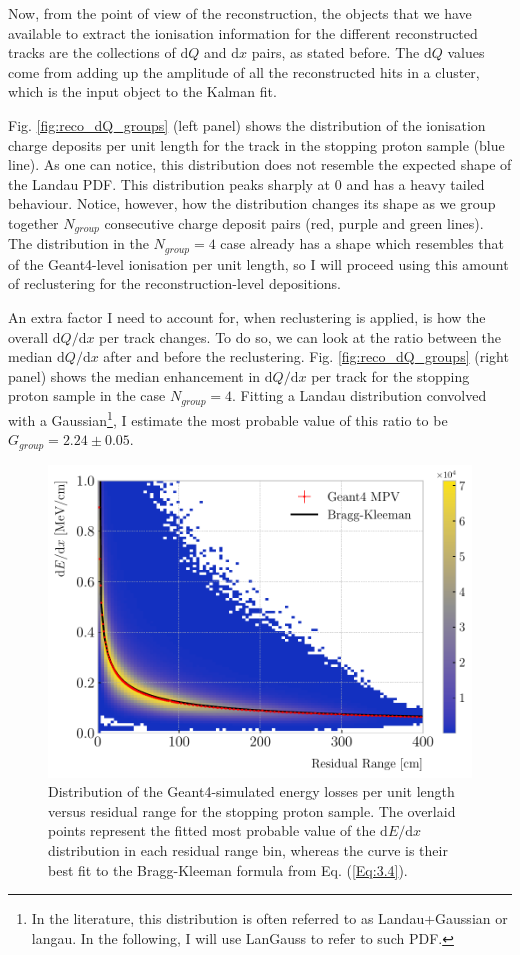 Now, from the point of view of the reconstruction, the objects that we have available to extract the ionisation information for the different reconstructed tracks are the collections of $\mathrm{d}Q$ and $\mathrm{d}x$ pairs, as stated before. The $\mathrm{d}Q$ values come from adding up the amplitude of all the reconstructed hits in a cluster, which is the input object to the Kalman fit.

Fig. \ref{fig:reco_dQ_groups} (left panel) shows the distribution of the ionisation charge deposits per unit length for the track in the stopping proton sample (blue line). As one can notice, this distribution does not resemble the expected shape of the Landau PDF. This distribution peaks sharply at $0$ and has a heavy tailed behaviour. Notice, however, how the distribution changes its shape as we group together $N_{group}$ consecutive charge deposit pairs (red, purple and green lines). The distribution in the $N_{group} = 4$ case already has a shape which resembles that of the Geant4-level ionisation per unit length, so I will proceed using this amount of reclustering for the reconstruction-level depositions.

An extra factor I need to account for, when reclustering is applied, is how the overall $\mathrm{d}Q/\mathrm{d}x$ per track changes. To do so, we can look at the ratio between the median $\mathrm{d}Q/\mathrm{d}x$ after and before the reclustering. Fig. \ref{fig:reco_dQ_groups} (right panel) shows the median enhancement in $\mathrm{d}Q/\mathrm{d}x$ per track for the stopping proton sample in the case $N_{group}=4$. Fitting a Landau distribution convolved with a Gaussian\footnote{In the literature, this distribution is often referred to as Landau+Gaussian or langau. In the following, I will use LanGauss to refer to such PDF.}, I estimate the most probable value of this ratio to be $G_{group} = 2.24 \pm 0.05$.

\begin{figure}[t]
	\centering
	\includegraphics[width=.85\linewidth]{Images/GArSoft_PID/dEdx/bragg_kleeman_geant_langau.pdf}
	\caption{Distribution of the Geant4-simulated energy losses per unit length versus residual range for the stopping proton sample. The overlaid points represent the fitted most probable value of the $\mathrm{d}E/\mathrm{d}x$ distribution in each residual range bin, whereas the curve is their best fit to the Bragg-Kleeman formula from Eq. (\ref{Eq:3.4}).}
	\label{fig:bragg_kleeman}
\end{figure}


